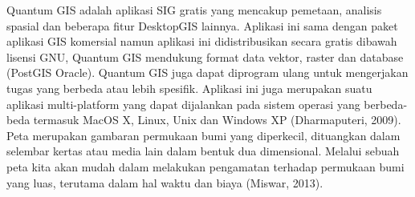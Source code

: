 Quantum GIS adalah aplikasi SIG gratis yang mencakup pemetaan, analisis spasial dan beberapa fitur DesktopGIS lainnya. Aplikasi ini sama dengan paket aplikasi GIS komersial namun aplikasi ini didistribusikan secara gratis dibawah lisensi GNU, Quantum GIS mendukung format data vektor, raster dan database (PostGIS Oracle). Quantum GIS juga dapat diprogram ulang untuk mengerjakan tugas yang berbeda atau lebih spesifik. Aplikasi ini juga merupakan suatu aplikasi multi-platform yang dapat dijalankan pada sistem operasi yang berbeda-beda termasuk MacOS X, Linux, Unix dan Windows XP (Dharmaputeri, 2009).
Peta merupakan gambaran permukaan bumi yang diperkecil, dituangkan dalam selembar kertas atau media lain dalam bentuk dua dimensional. Melalui sebuah peta kita akan mudah dalam melakukan pengamatan terhadap permukaan bumi yang luas, terutama dalam hal waktu dan biaya (Miswar, 2013).

